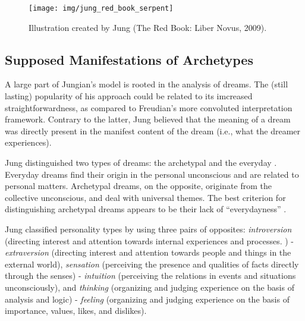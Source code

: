 \documentclass[
]{book}
\begin{document}
\begin{figure}

{\centering \texttt{[image: img/jung\_red\_book\_serpent]} 

}

\caption{Illustration created by Jung (The Red Book: Liber Novus, 2009).}\label{fig:unnamed-chunk-7}
\end{figure}

\hypertarget{supposed-manifestations-of-archetypes}{%
\subsection{Supposed Manifestations of Archetypes}\label{supposed-manifestations-of-archetypes}}

A large part of Jungian's model is rooted in the analysis of dreams. The (still lasting) popularity of his approach could be related to its imcreased straightforwardness, as compared to Freudian's more convoluted interpretation framework. Contrary to the latter, Jung believed that the meaning of a dream was directly present in the manifest content of the dream (i.e., what the dreamer experiences).

Jung distinguished two types of dreams: the archetypal and the everyday \citep{cann1986jungian}. Everyday dreams find their origin in the personal unconscious and are related to personal matters. Archetypal dreams, on the opposite, originate from the collective unconscious, and deal with universal themes. The best criterion for distinguishing archetypal dreams appears to be their lack of ``everydayness'' \citep{kluger1975archetypal, cann1986jungian}.

Jung classified personality types by using three pairs of opposites: \emph{introversion} (directing interest and attention towards internal experiences and processes. ) - \emph{extraversion} (directing interest and attention towards people and things in the external world), \emph{sensation} (perceiving the presence and qualities of facts directly through the senses) - \emph{intuition} (perceiving the relations in events and situations unconsciously), and \emph{thinking} (organizing and judging experience on the basis of analysis and logic) - \emph{feeling} (organizing and judging experience on the basis of importance, values, likes, and dislikes).
\end{document}
